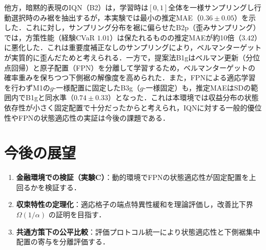 \documentclass[a4paper,twocolumn,10pt]{jsarticle}
\newcommand{\CVaR}{\mathrm{CVaR}}
\begin{document}
\begin{table}[t]
\centering
\vspace{-2pt}
\setlength{\tabcolsep}{2.5pt}
\caption{実験Bの性能比較（3シード平均$\pm$標本標準偏差（SD））．推定MAEは獲得方策下の$\CVaR_{0.05}$推定の平均絶対誤差，経験CVaRは5,000エピソードの実収益．裾点数は15個の内部quantile fraction中$[0,\alpha]$に入る数（IQNは連続サンプリングのため---）．}
\label{tab:expB}
\vspace{-2pt}
\end{table}

他方，暗黙的表現のIQN（B2）は，学習時は$[0,1]$全体を一様サンプリングし行動選択時のみ裾を抽出するが，本実験では最小の推定MAE（$0.36\pm0.05$）を示した．これに対し，サンプリング分布を裾に偏らせたB2p（歪みサンプリング）では，方策性能（経験CVaR $1.01$）は保たれるものの推定MAEが約10倍（$3.42$）に悪化した．これは重要度補正なしのサンプリングにより，ベルマンターゲットが実質的に歪んだためと考えられる．一方で，提案法B1gはベルマン更新（分位点回帰）と原子配置（FPN）を分離して学習するため，ベルマンターゲットの確率重みを保ちつつ下側裾の解像度を高められた．また，FPNによる適応学習を行わずM1の$g$-一様配置に固定したB3g（$g$-一様固定）も，推定MAEはSDの範囲内でB1gと同水準（$0.74\pm0.33$）となった．これは本環境では収益分布の状態依存性が小さく固定配置で十分だったからと考えられ，IQNに対する一般的優位性やFPNの状態適応性の実証は今後の課題である．

\section{今後の展望}
\vspace{-2pt}
\begin{enumerate}
\setlength{\topsep}{0pt}
\setlength{\itemsep}{-1pt}
\setlength{\parskip}{0pt}
\setlength{\parsep}{0pt}
\item \textbf{金融環境での検証（実験C）}：動的環境でFPNの状態適応性が固定配置を上回るかを検証する．
\item \textbf{収束特性の定理化}：適応格子の端点特異性緩和を理論評価し，改善比下界 $\Omega(1/\alpha)$ の証明を目指す．
\item \textbf{共通方策下の公平比較}：評価プロトコル統一により状態適応性と下側裾集中配置の寄与を分離評価する．
\end{enumerate}
\vspace{-2pt}
\end{document}
